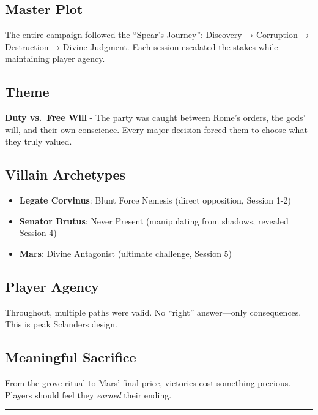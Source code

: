 \documentclass[
]{book}
\providecommand{\tightlist}{%
  \setlength{\itemsep}{0pt}\setlength{\parskip}{0pt}}
\begin{document}
\subsection{Master Plot}\label{master-plot}

The entire campaign followed the ``Spear's Journey'': Discovery →
Corruption → Destruction → Divine Judgment. Each session escalated the
stakes while maintaining player agency.

\subsection{Theme}\label{theme}

\textbf{Duty vs.~Free Will} - The party was caught between Rome's
orders, the gods' will, and their own conscience. Every major decision
forced them to choose what they truly valued.

\subsection{Villain Archetypes}\label{villain-archetypes}

\begin{itemize}
\tightlist
\item
  \textbf{Legate Corvinus}: Blunt Force Nemesis (direct opposition,
  Session 1-2)
\item
  \textbf{Senator Brutus}: Never Present (manipulating from shadows,
  revealed Session 4)
\item
  \textbf{Mars}: Divine Antagonist (ultimate challenge, Session 5)
\end{itemize}

\subsection{Player Agency}\label{player-agency}

Throughout, multiple paths were valid. No ``right'' answer---only
consequences. This is peak Sclanders design.

\subsection{Meaningful Sacrifice}\label{meaningful-sacrifice}

From the grove ritual to Mars' final price, victories cost something
precious. Players should feel they \emph{earned} their ending.

\begin{center}\rule{0.5\linewidth}{0.5pt}\end{center}
\end{document}
